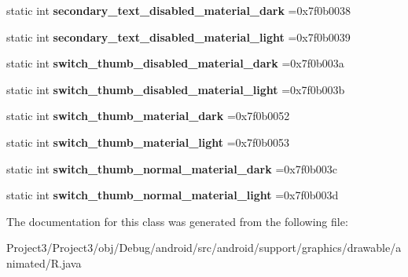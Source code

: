 \begin{DoxyCompactItemize}
\item 
\mbox{\label{classandroid_1_1support_1_1graphics_1_1drawable_1_1animated_1_1R_1_1color_a50b7a4c8f2d76e759ac4ea5e8abd1052}} 
static int {\bfseries secondary\+\_\+text\+\_\+disabled\+\_\+material\+\_\+dark} =0x7f0b0038
\item 
\mbox{\label{classandroid_1_1support_1_1graphics_1_1drawable_1_1animated_1_1R_1_1color_ae948064593d165ecb500192771ed51a2}} 
static int {\bfseries secondary\+\_\+text\+\_\+disabled\+\_\+material\+\_\+light} =0x7f0b0039
\item 
\mbox{\label{classandroid_1_1support_1_1graphics_1_1drawable_1_1animated_1_1R_1_1color_abe8dc53ca5a83a578eaf1f1731811532}} 
static int {\bfseries switch\+\_\+thumb\+\_\+disabled\+\_\+material\+\_\+dark} =0x7f0b003a
\item 
\mbox{\label{classandroid_1_1support_1_1graphics_1_1drawable_1_1animated_1_1R_1_1color_af36a65108fee8c29a6cee4df06cfea75}} 
static int {\bfseries switch\+\_\+thumb\+\_\+disabled\+\_\+material\+\_\+light} =0x7f0b003b
\item 
\mbox{\label{classandroid_1_1support_1_1graphics_1_1drawable_1_1animated_1_1R_1_1color_a363ce771e7a94a0aae0d690346d0a665}} 
static int {\bfseries switch\+\_\+thumb\+\_\+material\+\_\+dark} =0x7f0b0052
\item 
\mbox{\label{classandroid_1_1support_1_1graphics_1_1drawable_1_1animated_1_1R_1_1color_a9054d0d79d3eccc171723234b4114ce6}} 
static int {\bfseries switch\+\_\+thumb\+\_\+material\+\_\+light} =0x7f0b0053
\item 
\mbox{\label{classandroid_1_1support_1_1graphics_1_1drawable_1_1animated_1_1R_1_1color_aff6e21cfdf2b549cc47f6bd580219d42}} 
static int {\bfseries switch\+\_\+thumb\+\_\+normal\+\_\+material\+\_\+dark} =0x7f0b003c
\item 
\mbox{\label{classandroid_1_1support_1_1graphics_1_1drawable_1_1animated_1_1R_1_1color_a68b4c8c14c093f8e4d722a3f12e6f409}} 
static int {\bfseries switch\+\_\+thumb\+\_\+normal\+\_\+material\+\_\+light} =0x7f0b003d
\end{DoxyCompactItemize}


The documentation for this class was generated from the following file\+:\begin{DoxyCompactItemize}
\item 
Project3/\+Project3/obj/\+Debug/android/src/android/support/graphics/drawable/animated/R.\+java\end{DoxyCompactItemize}
